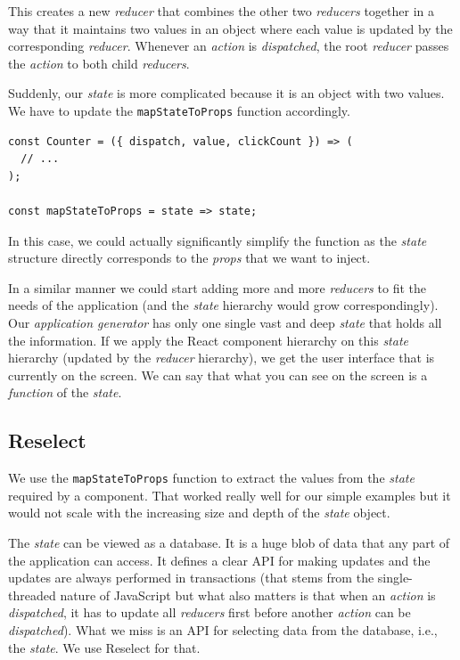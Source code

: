 This creates a new \emph{reducer} that combines the other two \emph{reducers} together in a way that it maintains two values in an object where each value is updated by the corresponding \emph{reducer}. Whenever an \emph{action} is \emph{dispatched}, the root \emph{reducer} passes the \emph{action} to both child \emph{reducers}.

Suddenly, our \emph{state} is more complicated because it is an object with two values. We have to update the \texttt{mapStateToProps} function accordingly.

\begin{verbatim}
const Counter = ({ dispatch, value, clickCount }) => (
  // ...
);

const mapStateToProps = state => state;
\end{verbatim}

In this case, we could actually significantly simplify the function as the \emph{state} structure directly corresponds to the \emph{props} that we want to inject.

In a similar manner we could start adding more and more \emph{reducers} to fit the needs of the application (and the \emph{state} hierarchy would grow correspondingly). Our \emph{application generator} has only one single vast and deep \emph{state} that holds all the information. If we apply the React component hierarchy on this \emph{state} hierarchy (updated by the \emph{reducer} hierarchy), we get the user interface that is currently on the screen.  We can say that what you can see on the screen is a \emph{function} of the \emph{state}.


\subsection{Reselect}

We use the \texttt{mapStateToProps} function to extract the values from the \emph{state} required by a component. That worked really well for our simple examples but  it would not scale with the increasing size and depth of the \emph{state} object.

The \emph{state} can be viewed as a database. It is a huge blob of data that any part of the application can access. It defines a clear API for making updates and the updates are always performed in transactions (that stems from the single-threaded nature of JavaScript but what also matters is that when an \emph{action} is \emph{dispatched}, it has to update all \emph{reducers} first before another \emph{action} can be \emph{dispatched}). What we miss is an API for selecting data from the database, i.e., the \emph{state}. We use Reselect \cite{reselect} for that.

